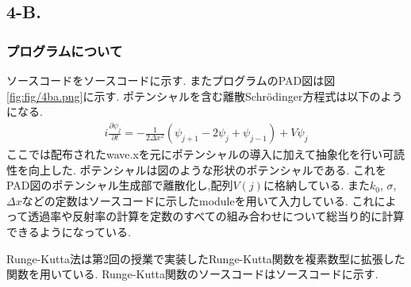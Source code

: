 \subsection*{4-B.}
\subsubsection*{プログラムについて}
ソースコードをソースコードに示す.
またプログラムのPAD図は図\ref{fig:fig/4ba.png}に示す.
ポテンシャルを含む離散Schr\"{o}dinger方程式は以下のようになる.
\begin{align}
  i\frac{\partial\psi_j}{\partial t}=-\frac{1}{2\Delta x^2}(\psi_{j+1}-2\psi_j+\psi_{j-1})+V\psi_j
\end{align}
ここでは配布されたwave.xを元にポテンシャルの導入に加えて抽象化を行い可読性を向上した.
ポテンシャルは図のような形状のポテンシャルである.
これをPAD図のポテンシャル生成部で離散化し,配列$V(j)$に格納している.
また$k_0$, $\sigma$, $\Delta x$などの定数はソースコードに示したmoduleを用いて入力している.
これによって透過率や反射率の計算を定数のすべての組み合わせについて総当り的に計算できるようになっている.

Runge-Kutta法は第2回の授業で実装したRunge-Kutta関数を複素数型に拡張した関数を用いている.
Runge-Kutta関数のソースコードはソースコードに示す.
